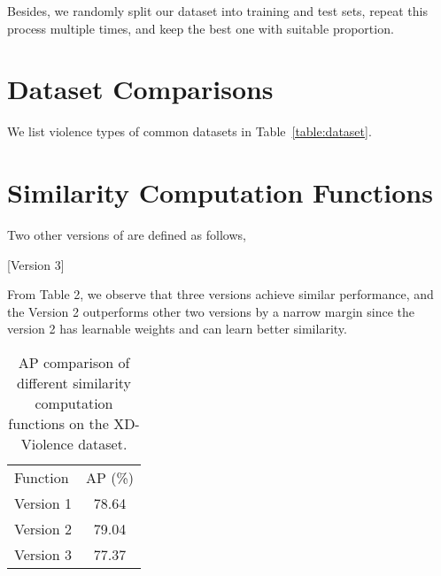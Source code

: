 \documentclass[runningheads]{llncs}
\begin{document}
Besides, we randomly split our dataset into training and test sets, repeat this process multiple times, and keep the best one with suitable proportion.
\setlength{\tabcolsep}{4pt}
\begin{table}[h]
\begin{center}
\caption{Comparisons of violence types.}
\label{table:dataset}
\end{center}
\end{table}

\section{Dataset Comparisons}
We list violence types of common datasets in Table~\ref{table:dataset}.

\section{Similarity Computation Functions}

Two other versions of  are defined as follows,

\noindent[Version 2]	 

[Version 3]	 


From Table 2, we observe that three versions achieve similar performance, and the Version 2 outperforms other two versions by a narrow margin since the version 2 has learnable weights and can learn better similarity.
\setlength{\tabcolsep}{4pt}
\begin{table}[t]
\begin{center}
\caption{AP comparison of different similarity computation functions on the XD-Violence dataset.}
\label{table:f}

\begin{tabular}{lc}
\hline\noalign{\smallskip}
Function  &  AP (\%) \\
\noalign{\smallskip}
\hline
\noalign{\smallskip}
Version 1   & 78.64 \\
Version 2   & 79.04  \\
Version 3   & 77.37  \\
\hline
\end{tabular}
\end{center}
\end{table}
\end{document}

